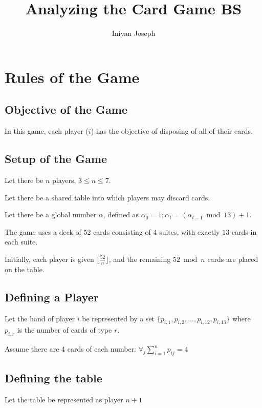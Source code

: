 \documentclass[letterpaper,11pt]{report}
\title{Analyzing the Card Game BS}
\author{Iniyan Joseph}
\date{}
\begin{document}
\maketitle
\tableofcontents

\chapter{Rules of the Game}
\begin{description}
    \section{Objective of the Game}
    \item [Objective] In this game, each player ($i$) has the objective of disposing of all of their cards.
    \section{Setup of the Game}
    \item Let there be $n$ players, $3\leq n\leq 7$.
    \item Let there be a shared table into which players may discard cards.
    \item Let there be a global number $\alpha$, defined as $\alpha_{0} = 1; \alpha_{t} = (\alpha_{t-1} \bmod 13) + 1$.
    \item The game uses a deck of 52 cards consisting of 4 suites, with exactly $13$ cards in each suite. 
    \item Initially, each player is given $\lfloor\frac{52}{n}\rfloor$, and the remaining $52 \bmod n$ cards are placed on the table.
    \section{Defining a Player}
    \item Let the hand of player $i$ be represented by a set $\{p_{i, 1}, p_{i, 2}, ..., p_{i, 12}, p_{i, 13}\}$ where $p_{i, r}$ is the number of cards of type $r$.
    \item Assume there are 4 cards of each number: $\forall_{j}\sum\limits_{i=1}^{n} p_{ij} = 4$
    \section{Defining the table}
    \item Let the table be represented as player $n+1$

\end{description}
\end{document}
